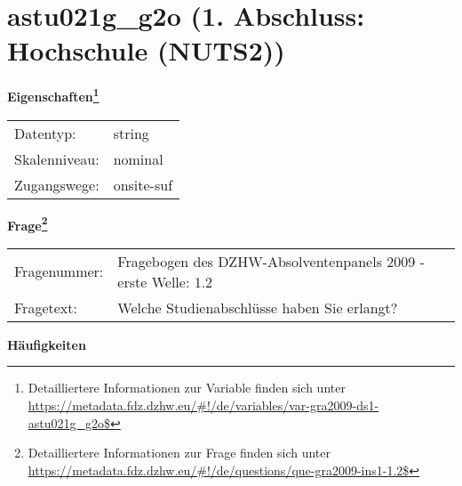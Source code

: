 
    \setcounter{footnote}{0}

    \vspace*{-1.8cm}
	\section{astu021g\_g2o (1. Abschluss: Hochschule (NUTS2))}
	\label{section:astu021g_g2o}



    \vspace*{0.5cm}
    \noindent\textbf{Eigenschaften\footnote{Detailliertere Informationen zur Variable finden sich unter
		\url{https://metadata.fdz.dzhw.eu/\#!/de/variables/var-gra2009-ds1-astu021g_g2o$}}}\\
	\begin{tabularx}{\hsize}{@{}lX}
	Datentyp: & string \\
	Skalenniveau: & nominal \\
	Zugangswege: &
	  onsite-suf
 \\
    \end{tabularx}



				\vspace*{0.5cm}
                \noindent\textbf{Frage\footnote{Detailliertere Informationen zur Frage finden sich unter
		              \url{https://metadata.fdz.dzhw.eu/\#!/de/questions/que-gra2009-ins1-1.2$}}}\\
				\begin{tabularx}{\hsize}{@{}lX}
					Fragenummer: &
					  Fragebogen des DZHW-Absolventenpanels 2009 - erste Welle:
					  1.2
 \\
					Fragetext: & Welche Studienabschlüsse haben Sie erlangt? \\
				\end{tabularx}





        		\vspace*{0.5cm}
                \noindent\textbf{Häufigkeiten}

